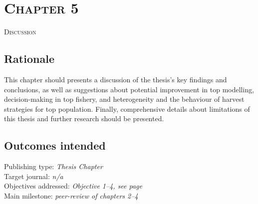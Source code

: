 \section*{\scshape Chapter 5}
{\Large \scshape Discussion} %

\subsection*{Rationale}

This chapter should presents a discussion of the thesis’s key findings and conclusions, as well as suggestions about potential improvement in \acl{top} modelling, decision-making in \acl{top} fishery, and heterogeneity and the behaviour of harvest strategies for \acl{top} population. Finally, comprehensive details about limitations of this thesis and further research should be presented.

\subsection*{Outcomes intended}

Publishing type: \textit{Thesis Chapter} \\
Target journal: \textit{n/a} \\
Objectives addressed: \textit{Objective 1--4, see page~\pageref{subsec:objetives} }\\
Main milestone: \textit{peer-review of chapters 2--4}



\vspace{3cm}